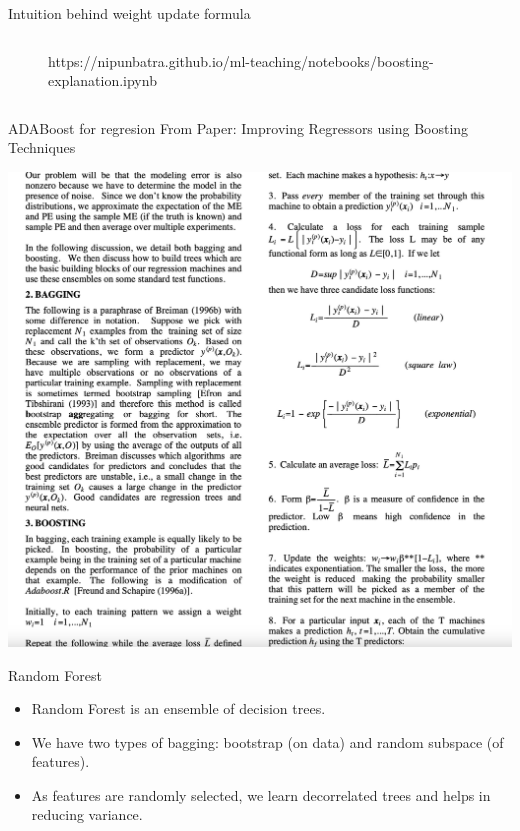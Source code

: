 \documentclass{beamer}
\begin{document}
\begin{frame}{Intuition behind weight update formula}
\begin{columns}
\begin{column}{0.5\textwidth}
\begin{figure}[htp]
\begin{notebookbox}{https://nipunbatra.github.io/ml-teaching/notebooks/boosting-explanation.ipynb}
        \end{notebookbox}
      \end{figure}
    \end{column}
  \end{columns}


\end{frame}

\begin{frame}{ADABoost for regresion}
  From Paper: Improving Regressors using Boosting Techniques

  \includegraphics[scale=0.1]{../assets/ensemble/diagrams/adaboost-regression.jpg}
  
\end{frame}

\begin{frame}{Random Forest}
  \begin{itemize}
    \item Random Forest is an ensemble of decision trees.
    \item We have two types of bagging: bootstrap (on data) and random subspace (of features).
    \item As features are randomly selected, we learn decorrelated trees and helps in reducing variance.
  \end{itemize}
\end{frame}
\end{document}
